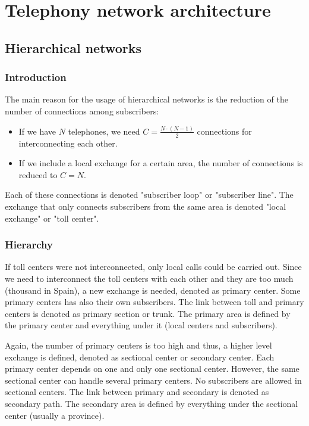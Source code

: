\documentclass[
	12pt,
	twoside
]{book}
\begin{document}
\section{Telephony network architecture}

\subsection{Hierarchical networks}

\subsubsection{Introduction}

The main reason for the usage of hierarchical networks is the reduction of the number of connections among subscribers:

\begin{itemize}
	\item If we have $N$ telephones, we need $C = \frac {N \cdot (N - 1)} {2}$ connections for interconnecting each other.
	\item If we include a local exchange for a certain area, the number of connections is reduced to $C = N$.
\end{itemize}
Each of these connections is denoted "subscriber loop" or "subscriber line". The exchange that only connects subscribers from the same area is denoted "local exchange" or "toll center".

\subsubsection{Hierarchy}

If toll centers were not interconnected, only local calls could be carried out. Since we need to interconnect the toll centers with each other and they are too much (thousand in Spain), a new exchange is needed, denoted as primary center. Some primary centers has also their own subscribers. The link between toll and primary centers is denoted as primary section or trunk. The primary area is defined by the primary center and everything under it (local centers and subscribers).

Again, the number of primary centers is too high and thus, a higher level exchange is defined, denoted as sectional center or secondary center. Each primary center depends on one and only one sectional center. However, the same sectional center can handle several primary centers. No subscribers are allowed in sectional centers. The link between primary and secondary is denoted as secondary path. The secondary area is defined by everything under the sectional center (usually a province).
\end{document}
